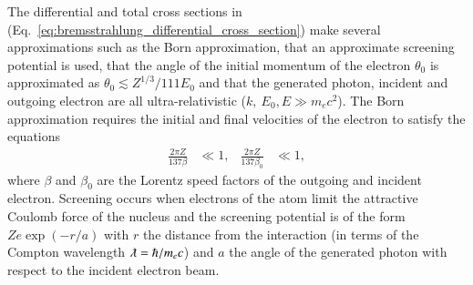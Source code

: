 \documentclass[../main.tex]{subfiles}
\begin{document}
The differential and total cross sections in (Eq.~\ref{eq:bremsstrahlung_differential_cross_section}) make several approximations such as the Born approximation, that an approximate screening potential is used, that the angle of the initial momentum of the electron $\theta_{0}$ is approximated as $\theta_{0} \lesssim Z^{1/3}/111E_{0}$ and that the generated photon, incident and outgoing electron are all ultra-relativistic ($k,~E_{0},E \gg m_{e}c^{2}$). The Born approximation requires the initial and final velocities of the electron to satisfy the equations
\begin{align}
\frac{2\pi Z}{137\beta} &\ll 1, & \frac{2\pi Z}{137\beta_{0}} &\ll 1,
\label{eq:Born_approximation}    
\end{align}
where $\beta$ and $\beta_{0}$ are the Lorentz speed factors of the outgoing and incident electron. Screening occurs when electrons of the atom limit the attractive Coulomb force of the nucleus and the screening potential is of the form $Ze\exp\left(-r/a\right)$ \cite{schiff1951energy} with $r$ the distance from the interaction (in terms of the Compton wavelength $\lambdabar = \hbar/m_{e}c$) and $a$ the angle of the generated photon with respect to the incident electron beam.
\end{document}
